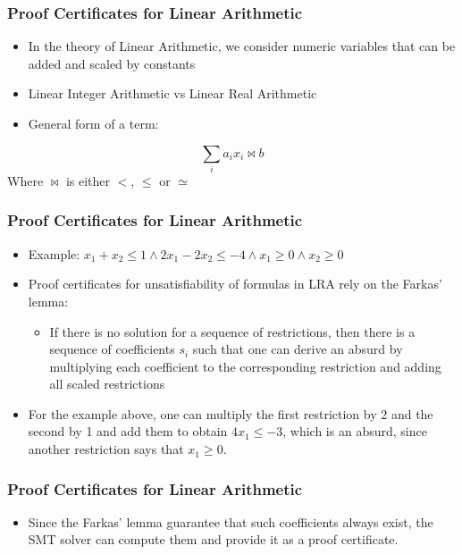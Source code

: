 \documentclass[usepdftitle=false,aspectratio=169,usenames,dvipsnames]{beamer}
\newcommand\vitem{\vfill\item}
\begin{document}
\begin{frame}
  \frametitle{Proof Certificates for Linear Arithmetic}
  \begin{itemize}
    \item In the theory of Linear Arithmetic, we consider numeric variables that can be added and scaled by constants
    \vitem Linear Integer Arithmetic vs Linear Real Arithmetic
    \vitem General form of a term:
  \end{itemize}
  \[
    \sum_{i} a_{i} x_{i} \bowtie b
  \]
  Where $\bowtie$ is either $<$, $\le$ or $\simeq$
\end{frame}

\begin{frame}
  \frametitle{Proof Certificates for Linear Arithmetic}
  \begin{itemize}
    \item Example: $x_{1} + x_{2} \le 1 \wedge 2x_{1} - 2x_{2} \le -4 \wedge x_{1} \ge 0 \wedge x_{2} \ge 0$
    \vitem Proof certificates for unsatisfiability of formulas in LRA rely on the Farkas' lemma:
    \begin{itemize}
      \item If there is no solution for a sequence of restrictions, then there is a sequence of coefficients $s_{i}$ such that one can derive an absurd by multiplying each coefficient to the corresponding restriction and adding all scaled restrictions
    \end{itemize}
    \vitem For the example above, one can multiply the first restriction by 2 and the second by 1 and add them to obtain $4x_{1} \le -3$, which is an absurd, since another restriction says that $x_{1} \ge 0$.
  \end{itemize}
\end{frame}

\begin{frame}
  \frametitle{Proof Certificates for Linear Arithmetic}
  \begin{itemize}
    \item Since the Farkas' lemma guarantee that such coefficients always exist, the SMT solver can compute them and provide it as a proof certificate.
  \end{itemize}
\end{frame}
\end{document}
